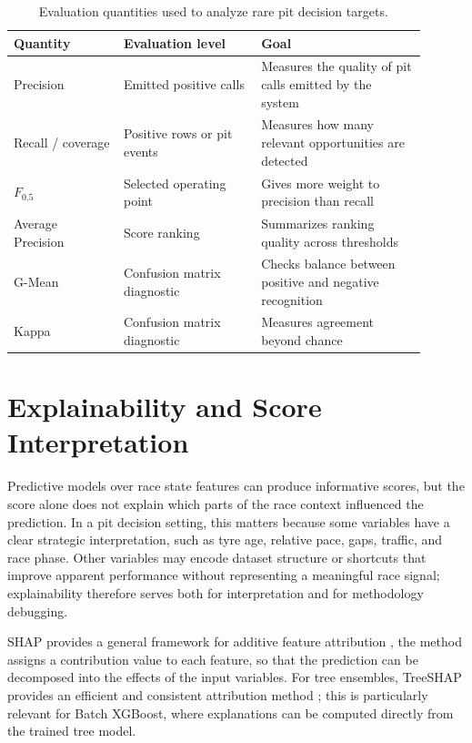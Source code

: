 \begin{table}[t]
    \centering
    \caption{Evaluation quantities used to analyze rare pit decision targets.}
    \label{tab:chapter2_metrics}
    \begin{tabular}{p{0.24\linewidth}p{0.30\linewidth}p{0.36\linewidth}}
        \toprule
        Quantity          & Evaluation level            & Goal                                                     \\
        \midrule
        Precision         & Emitted positive calls      & Measures the quality of pit calls emitted by the system  \\
        Recall / coverage & Positive rows or pit events & Measures how many relevant opportunities are detected    \\
        $F_{0.5}$         & Selected operating point    & Gives more weight to precision than recall               \\
        Average Precision & Score ranking               & Summarizes ranking quality across thresholds             \\
        G-Mean            & Confusion matrix diagnostic & Checks balance between positive and negative recognition \\
        Kappa             & Confusion matrix diagnostic & Measures agreement beyond chance                         \\
        \bottomrule
    \end{tabular}
\end{table}
\FloatBarrier


\section{Explainability and Score Interpretation}

Predictive models over race state features can produce informative scores, but the score alone does not explain which parts of the race context influenced the prediction.
In a pit decision setting, this matters because some variables have a clear strategic interpretation, such as tyre age, relative pace, gaps, traffic, and race phase.
Other variables may encode dataset structure or shortcuts that improve apparent performance without representing a meaningful race signal; explainability therefore serves
both for interpretation and for methodology debugging.

SHAP provides a general framework for additive feature attribution \citep{lundberg2017shap}, the method assigns a contribution value to each feature, so that the prediction
can be decomposed into the effects of the input variables. For tree ensembles, TreeSHAP provides an efficient and consistent attribution method \citep{lundberg2018treeshap};
this is particularly relevant for Batch XGBoost, where explanations can be computed directly from the trained tree model.

